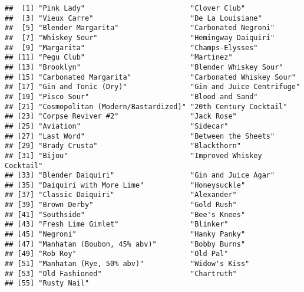\documentclass[
]{article}
\newenvironment{Shaded}{\begin{snugshade}}{\end{snugshade}}
\newcommand{\KeywordTok}[1]{\textcolor[rgb]{0.13,0.29,0.53}{\textbf{#1}}}
\newcommand{\NormalTok}[1]{#1}
\newcommand{\OperatorTok}[1]{\textcolor[rgb]{0.81,0.36,0.00}{\textbf{#1}}}
\newcommand{\StringTok}[1]{\textcolor[rgb]{0.31,0.60,0.02}{#1}}
\begin{document}
\begin{verbatim}
##  [1] "Pink Lady"                         "Clover Club"                      
##  [3] "Vieux Carre"                       "De La Louisiane"                  
##  [5] "Blender Margarita"                 "Carbonated Negroni"               
##  [7] "Whiskey Sour"                      "Hemingway Daiquiri"               
##  [9] "Margarita"                         "Champs-Elysses"                   
## [11] "Pegu Club"                         "Martinez"                         
## [13] "Brooklyn"                          "Blender Whiskey Sour"             
## [15] "Carbonated Margarita"              "Carbonated Whiskey Sour"          
## [17] "Gin and Tonic (Dry)"               "Gin and Juice Centrifuge"         
## [19] "Pisco Sour"                        "Blood and Sand"                   
## [21] "Cosmopolitan (Modern/Bastardized)" "20th Century Cocktail"            
## [23] "Corpse Reviver #2"                 "Jack Rose"                        
## [25] "Aviation"                          "Sidecar"                          
## [27] "Last Word"                         "Between the Sheets"               
## [29] "Brady Crusta"                      "Blackthorn"                       
## [31] "Bijou"                             "Improved Whiskey Cocktail"        
## [33] "Blender Daiquiri"                  "Gin and Juice Agar"               
## [35] "Daiquiri with More Lime"           "Honeysuckle"                      
## [37] "Classic Daiquiri"                  "Alexander"                        
## [39] "Brown Derby"                       "Gold Rush"                        
## [41] "Southside"                         "Bee's Knees"                      
## [43] "Fresh Lime Gimlet"                 "Blinker"                          
## [45] "Negroni"                           "Hanky Panky"                      
## [47] "Manhatan (Boubon, 45% abv)"        "Bobby Burns"                      
## [49] "Rob Roy"                           "Old Pal"                          
## [51] "Manhatan (Rye, 50% abv)"           "Widow's Kiss"                     
## [53] "Old Fashioned"                     "Chartruth"                        
## [55] "Rusty Nail"
\end{verbatim}

\begin{Shaded}
\end{Shaded}
\end{document}
